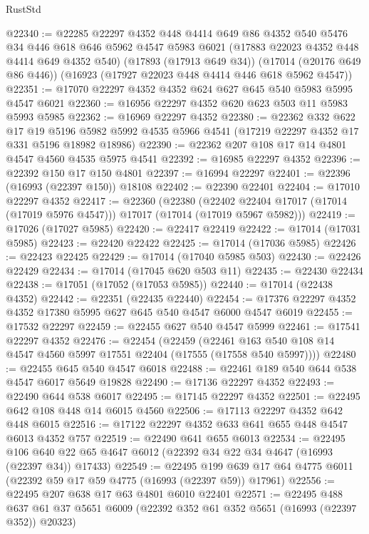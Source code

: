\begin{lexlean}{RustStd}
\begin{coremodule}
{\begin{coremodule}
{{{{{{{{{{{{{{{{{{{{{{{{{{{{{{{{{{{{{{{{{{{{{{{{{{{{{{{@22340 := @22285
    @22297
    @4352
    @448
    @4414
    @649
    @86
    @4352
    @540
    @5476
    @34
    @446
    @618
    @646
    @5962
    @4547
    @5983
    @6021
    (@17883 @22023 @4352 @448 @4414 @649 @4352 @540)
    (@17893 (@17913 @649 @34))
    (@17014 (@20176 @649 @86 @446))
    (@16923 (@17927 @22023 @448 @4414 @446 @618 @5962 @4547))
@22351 := @17070 @22297 @4352 @4352 @624 @627 @645 @540 @5983 @5995 @4547 @6021
@22360 := @16956 @22297 @4352 @620 @623 @503 @11 @5983 @5993 @5985
@22362 := @16969 @22297 @4352
@22380 := @22362
    @332
    @622
    @17
    @19
    @5196
    @5982
    @5992
    @4535
    @5966
    @4541
    (@17219 @22297 @4352 @17 @331 @5196 @18982 @18986)
@22390 := @22362 @207 @108 @17 @14 @4801 @4547 @4560 @4535 @5975 @4541
@22392 := @16985 @22297 @4352
@22396 := @22392 @150 @17 @150 @4801
@22397 := @16994 @22297
@22401 := @22396 (@16993 (@22397 @150)) @18108
@22402 := @22390 @22401
@22404 := @17010 @22297 @4352
@22417 := @22360
    (@22380
      (@22402 @22404 @17017 (@17014 (@17019 @5976 @4547)))
      @17017
      (@17014 (@17019 @5967 @5982)))
@22419 := @17026 (@17027 @5985)
@22420 := @22417 @22419
@22422 := @17014 (@17031 @5985)
@22423 := @22420 @22422
@22425 := @17014 (@17036 @5985)
@22426 := @22423 @22425
@22429 := @17014 (@17040 @5985 @503)
@22430 := @22426 @22429
@22434 := @17014 (@17045 @620 @503 @11)
@22435 := @22430 @22434
@22438 := @17051 (@17052 (@17053 @5985))
@22440 := @17014 (@22438 @4352)
@22442 := @22351 (@22435 @22440)
@22454 := @17376 @22297 @4352 @4352 @17380 @5995 @627 @645 @540 @4547 @6000 @4547 @6019
@22455 := @17532 @22297
@22459 := @22455 @627 @540 @4547 @5999
@22461 := @17541 @22297 @4352
@22476 := @22454
    (@22459
      (@22461 @163 @540 @108 @14 @4547 @4560 @5997 @17551 @22404 (@17555 (@17558 @540 @5997))))
@22480 := @22455 @645 @540 @4547 @6018
@22488 := @22461 @189 @540 @644 @538 @4547 @6017 @5649 @19828
@22490 := @17136 @22297 @4352
@22493 := @22490 @644 @538 @6017
@22495 := @17145 @22297 @4352
@22501 := @22495 @642 @108 @448 @14 @6015 @4560
@22506 := @17113 @22297 @4352 @642 @448 @6015
@22516 := @17122 @22297 @4352 @633 @641 @655 @448 @4547 @6013 @4352 @757
@22519 := @22490 @641 @655 @6013
@22534 := @22495
    @106
    @640
    @22
    @65
    @4647
    @6012
    (@22392 @34 @22 @34 @4647 (@16993 (@22397 @34)) @17433)
@22549 := @22495
    @199
    @639
    @17
    @64
    @4775
    @6011
    (@22392 @59 @17 @59 @4775 (@16993 (@22397 @59)) @17961)
@22556 := @22495 @207 @638 @17 @63 @4801 @6010 @22401
@22571 := @22495
    @488
    @637
    @61
    @37
    @5651
    @6009
    (@22392 @352 @61 @352 @5651 (@16993 (@22397 @352)) @20323)
}}}}}}}}}}}}}}}}}}}}}}}}}}}}}}}}}}}}}}}}}}}}}}}}}}}}}}}
\end{coremodule}}
\end{coremodule}
\end{lexlean}
